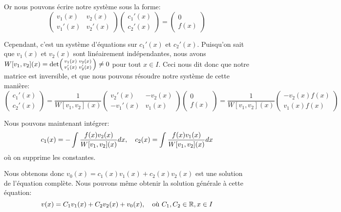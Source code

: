 \documentclass[a4paper]{article}
\begin{document}
{Or nous pouvons écrire notre système sous la forme:
\[\begin{pmatrix} v_1\left(x\right) & v_2\left(x\right) \\ v_1'\left(x\right) & v_2'\left(x\right) \end{pmatrix} \begin{pmatrix} c_1'\left(x\right) \\ c_2'\left(x\right) \end{pmatrix} = \begin{pmatrix} 0 \\ f\left(x\right) \end{pmatrix} \]

Cependant, c'est un système d'équations sur $c_1'\left(x\right)$ et $c_2'\left(x\right)$. Puisqu'on sait que $v_1\left(x\right)$ et $v_2\left(x\right)$ sont linéairement indépendantes, nous avons $W\left[v_1, v_2\right]\left(x\right) = \det\begin{psmallmatrix} v_1\left(x\right) & v_2\left(x\right) \\ v_1'\left(x\right) & v_2'\left(x\right) \end{psmallmatrix} \neq 0$ pour tout $x \in I$. Ceci nous dit donc que notre matrice est inversible, et que nous pouvons résoudre notre système de cette manière:
\[\begin{pmatrix} c_1'\left(x\right) \\ c_2'\left(x\right) \end{pmatrix} = \frac{1}{W\left[v_1, v_2\right]\left(x\right)} \begin{pmatrix} v_2'\left(x\right) & -v_2\left(x\right) \\ -v_1'\left(x\right) & v_1\left(x\right) \end{pmatrix} \begin{pmatrix} 0 \\ f\left(x\right) \end{pmatrix} = \frac{1}{W\left[v_1, v_2\right]\left(x\right)} \begin{pmatrix} -v_2\left(x\right) f\left(x\right) \\ v_1\left(x\right) f\left(x\right) \end{pmatrix} \]

Nous pouvons maintenant intégrer:
\[c_1\left(x\right) = -\int \frac{f\left(x\right) v_2\left(x\right)}{W\left[v_1, v_2\right]\left(x\right)}dx, \mathspace c_2\left(x\right) = \int \frac{f\left(x\right) v_1\left(x\right)}{W\left[v_1, v_2\right]\left(x\right)}dx\]
où on supprime les constantes.

Nous obtenons donc $v_0\left(x\right) = c_1\left(x\right) v_1\left(x\right) + c_2\left(x\right) v_2\left(x\right)$ est une solution de l'équation complète. Nous pouvons même obtenir la solution générale à cette équation:
\[v\left(x\right) = C_1 v_1\left(x\right) + C_2 v_2\left(x\right) + v_0\left(x\right), \mathspace \text{où } C_1, C_2 \in \mathbb{R}, x \in I\]
}
\end{document}
